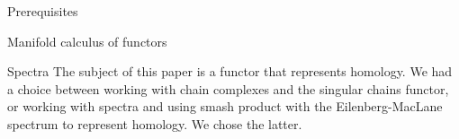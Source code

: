 \documentclass[12pt]{amsart}
\newcommand{\Top}{\operatorname{Top}}
\theoremstyle{plain}
\newtheorem{thm}{Theorem}[section]
\theoremstyle{definition}
\newtheorem{defin}[thm]{Definition}
\theoremstyle{remark}
\begin{document}
\begin{section}{Prerequisites}
\begin{subsection}{Manifold calculus of functors}
%
%
%
\end{subsection}


\vspace*{0.5cm}
\begin{subsection}{Spectra}
The subject of this paper is a functor that represents homology. We had a choice between working with chain complexes and the singular chains functor, or working with spectra and using smash product with the Eilenberg-MacLane spectrum to represent homology. We chose the latter.


\end{subsection}
\end{section}
\end{document}
